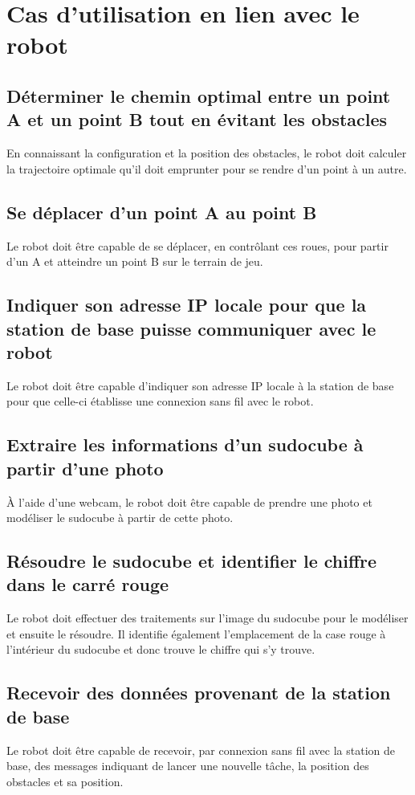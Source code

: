 \section{Cas d'utilisation en lien avec le robot}
\subsection{Déterminer le chemin optimal entre un point A et un point B tout en évitant les obstacles}
En connaissant la configuration et la position des obstacles, le robot doit calculer la trajectoire optimale qu'il doit emprunter pour se rendre d'un point à un autre.
\subsection{Se déplacer d'un point A au point B}
Le robot doit être capable de se déplacer, en contrôlant ces roues, pour partir d'un A et atteindre un point B sur le terrain de jeu.
\subsection{Indiquer son adresse IP locale pour que la station de base puisse communiquer avec le robot}
Le robot doit être capable d'indiquer son adresse IP locale à la station de base pour que celle-ci établisse une connexion sans fil avec le robot.
\subsection{Extraire les informations d'un sudocube à partir d'une photo}
À l'aide d'une webcam, le robot doit être capable de prendre une photo et modéliser le sudocube à partir de cette photo.
\subsection{Résoudre le sudocube et identifier le chiffre dans le carré rouge}
Le robot doit effectuer des traitements sur l'image du sudocube pour le modéliser et ensuite le résoudre. Il identifie également l'emplacement de la case rouge à l'intérieur du sudocube et donc trouve le chiffre qui s'y trouve.
\subsection{Recevoir des données provenant de la station de base}
Le robot doit être capable de recevoir, par connexion sans fil avec la station de base, des messages indiquant de lancer une nouvelle tâche, la position des obstacles et sa position.
